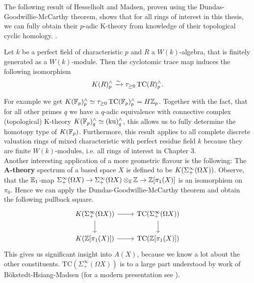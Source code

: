 The following result of Hesselholt and Madsen, proven using the Dundas-Goodwillie-McCarthy theorem, shows that for all rings of interest in this thesis, we can fully obtain their $p$-adic K-theory from knowledge of their topological cyclic homology.  
. 
\begin{thm}\cite[Theorem~D]{HMWV}
    Let $k$ be a perfect field of characteristic $p$ and $R$ a $W(k)$-algebra, that is finitely generated as a $W(k)$-module. Then the cyclotomic trace map induces the following isomorphism
    \begin{align*}
        K(R)_p^{\wedge}\xrightarrow{\sim} \tau_{\geq 0}\operatorname{TC}(R)_p^{\wedge}.
    \end{align*}
\end{thm}
For example we get $K(\mathbb{F}_p)_p^{\wedge}\simeq \tau_{\geq 0}\operatorname{TC}(\mathbb{F}_p)_p^{\wedge}=H\mathbb{Z}_p$. Together with the fact, that for all other primes $q$ we have a $q$-adic equivalence with connective complex (topological) K-theory $K(\mathbb{F}_p)_q^{\wedge}\simeq (\mathrm{ku})_q^{\wedge}$, this allows us to fully determine the homotopy type of $K(\mathbb{F}_p)$. 
Furthermore, this result applies to all complete discrete valuation rings of mixed characteristic with perfect residue field $k$ because they are finite $W(k)$-modules, i.e. all rings of interest in Chapter 3. \\
Another interesting application of a more geometric flavour is the following: The \textbf{A-theory} spectrum of a based space $X$ is defined to be $K(\Sigma^{\infty}_{+}(\Omega X))$. Observe, that the $\mathbb{E}_1$-map $\Sigma^{\infty}_{+}(\Omega X)\rightarrow \Sigma^{\infty}_{+}(\Omega X)\otimes_{\mathbb{S}}\mathbb{Z}\rightarrow \mathbb{Z}[\pi_1(X)]$ is an isomorphism on $\pi_0$. Hence we can apply the Dundas-Goodwillie-McCarthy theorem and obtain the following pullback square.
\[\begin{tikzcd}
	{K(\Sigma^\infty_+(\Omega X))} & {\mathrm{TC}(\Sigma^\infty_+(\Omega X))} \\
	{K(\mathbb{Z}[\pi_1(X)])} & {\mathrm{TC}(\mathbb{Z}[\pi_1(X)])}
	\arrow[from=1-1, to=1-2]
	\arrow[from=1-2, to=2-2]
	\arrow[from=1-1, to=2-1]
	\arrow[from=2-1, to=2-2]
\end{tikzcd}\]
This gives us significant insight into $A(X)$, because we know a lot about the other constituents.
${\text{TC}(\Sigma^\infty_+(\Omega X))}$ is to a large part understood by work of Bökstedt-Hsiang-Madsen \cite{BHMtrace} (for a modern presentation see \cite[Section~IV.3]{NS}). 
